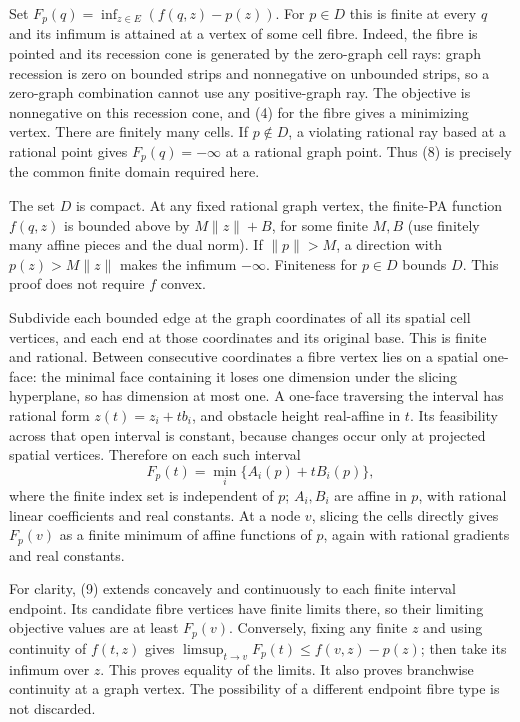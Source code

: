 \documentclass[
  11pt,
]{article}
\begin{document}
Set \(F_p(q)=\inf_{z\in E}(f(q,z)-p(z))\). For \(p\in D\) this is finite
at every \(q\) and its infimum is attained at a vertex of some cell
fibre. Indeed, the fibre is pointed and its recession cone is generated
by the zero-graph cell rays: graph recession is zero on bounded strips
and nonnegative on unbounded strips, so a zero-graph combination cannot
use any positive-graph ray. The objective is nonnegative on this
recession cone, and (4) for the fibre gives a minimizing vertex. There
are finitely many cells. If \(p\notin D\), a violating rational ray
based at a rational point gives \(F_p(q)=-\infty\) at a rational graph
point. Thus (8) is precisely the common finite domain required here.

The set \(D\) is compact. At any fixed rational graph vertex, the
finite-PA function \(f(q,z)\) is bounded above by \(M\|z\|+B\), for some
finite \(M,B\) (use finitely many affine pieces and the dual norm). If
\(\|p\|>M\), a direction with \(p(z)>M\|z\|\) makes the infimum
\(-\infty\). Finiteness for \(p\in D\) bounds \(D\). This proof does not
require \(f\) convex.

Subdivide each bounded edge at the graph coordinates of all its spatial
cell vertices, and each end at those coordinates and its original base.
This is finite and rational. Between consecutive coordinates a fibre
vertex lies on a spatial one-face: the minimal face containing it loses
one dimension under the slicing hyperplane, so has dimension at most
one. A one-face traversing the interval has rational form
\(z(t)=z_i+t b_i\), and obstacle height real-affine in \(t\). Its
feasibility across that open interval is constant, because changes occur
only at projected spatial vertices. Therefore on each such interval \[
 F_p(t)=\min_i\{A_i(p)+t B_i(p)\},                      \tag{9}
\] where the finite index set is independent of \(p\); \(A_i,B_i\) are
affine in \(p\), with rational linear coefficients and real constants.
At a node \(v\), slicing the cells directly gives \(F_p(v)\) as a finite
minimum of affine functions of \(p\), again with rational gradients and
real constants.

For clarity, (9) extends concavely and continuously to each finite
interval endpoint. Its candidate fibre vertices have finite limits
there, so their limiting objective values are at least \(F_p(v)\).
Conversely, fixing any finite \(z\) and using continuity of \(f(t,z)\)
gives \(\limsup_{t\to v}F_p(t)\leq f(v,z)-p(z)\); then take its infimum
over \(z\). This proves equality of the limits. It also proves
branchwise continuity at a graph vertex. The possibility of a different
endpoint fibre type is not discarded.
\end{document}

